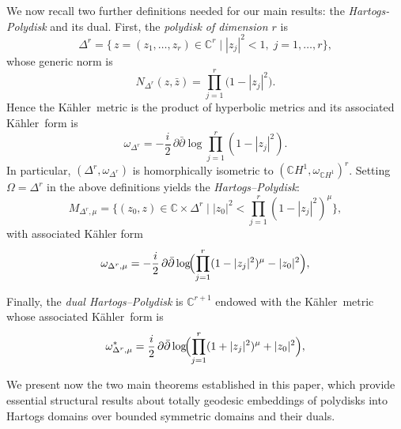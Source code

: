 \documentclass[reqno, 11pt]{amsart}
\newcommand{\C}{\mathbb{C}}
\newcommand{\K}{K\"ahler}
\begin{document}
\vskip 0.3cm

We now recall two further definitions needed for our main results: the \emph{Hartogs-Polydisk} and its dual.  First, the \emph{polydisk of dimension $r$} is
\[
\Delta^{r}
=\bigl\{\,z=(z_{1},\dots,z_{r})\in\mathbb{C}^{r}
\;\big|\;
|z_{j}|^{2}<1,\;j=1,\dots,r\bigr\},
\]
whose generic norm is
\[
N_{\Delta^{r}}(z,\bar z)
=\prod_{j=1}^{r}\bigl(1-|z_{j}|^{2}\bigr).
\]
Hence the \K\ metric is the product of hyperbolic metrics and its associated \K\  form is
\[
\omega_{\Delta^{r}}
=-\frac{i}{2}\,\partial\bar\partial
\log\!\prod_{j=1}^{r}(1-|z_{j}|^{2}).
\]
In particular, $(\Delta^{r},\omega_{\Delta^{r}})$ is homorphically isometric to $(\C H^1,\omega_{\C H^1})^r$.
Setting $\Omega=\Delta^{r}$ in the above definitions yields the \emph{Hartogs–Polydisk}:
\[
M_{\Delta^{r},\mu}
=\bigl\{(z_{0},z)\in\mathbb{C}\times\Delta^{r}
\;\big|\;
|z_{0}|^{2}<\prod_{j=1}^{r}(1-|z_{j}|^{2})^{\mu}\bigr\},
\]
with associated Kähler form
\[
\omega_{\Delta^{r},\mu}
=-\frac{i}{2}\,\partial\bar\partial
\log\!\Bigl(\prod_{j=1}^{r}(1-|z_{j}|^{2})^{\mu}-|z_{0}|^{2}\Bigr),
\]

Finally, the \emph{dual Hartogs–Polydisk} is $\mathbb{C}^{r+1}$  endowed with the \K\ metric whose associated \K\ form is
\[
\omega^{*}_{\Delta^{r},\mu}
=\frac{i}{2}\,\partial\bar\partial
\log\!\Bigl(\prod_{j=1}^{r}(1+|z_{j}|^{2})^{\mu}+|z_{0}|^{2}\Bigr),
\]

We present now the two  main theorems established in this paper, which provide essential structural results about totally geodesic embeddings of polydisks into Hartogs domains over bounded symmetric domains and their duals.
\end{document}

